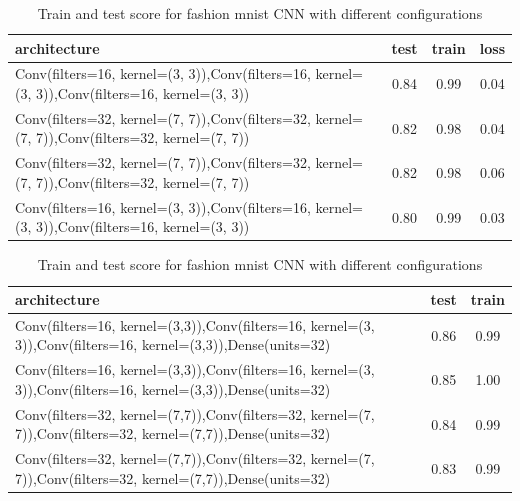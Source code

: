 \documentclass[10pt]{SelfArx} %
\begin{document}
	\begin{table}[]
		\begin{tabular*}{1\linewidth}{@{\extracolsep{\fill} }lccc@{}}
			\toprule
			architecture & test & train & loss \\ \midrule
			Conv(filters=16, kernel=(3, 3)),Conv(filters=16, kernel=(3, 3)),Conv(filters=16, kernel=(3, 3)) & 0.84 & 0.99 & 0.04 \\
			Conv(filters=32, kernel=(7, 7)),Conv(filters=32, kernel=(7, 7)),Conv(filters=32, kernel=(7, 7)) & 0.82 & 0.98 & 0.04 \\
			Conv(filters=32, kernel=(7, 7)),Conv(filters=32, kernel=(7, 7)),Conv(filters=32, kernel=(7, 7)) & 0.82 & 0.98 & 0.06 \\
			Conv(filters=16, kernel=(3, 3)),Conv(filters=16, kernel=(3, 3)),Conv(filters=16, kernel=(3, 3)) & 0.80 & 0.99 & 0.03 \\ \bottomrule
		\end{tabular*}
		\caption{Train and test score for fashion mnist CNN  with different configurations}
		\label{tfashion3}
	\end{table}
	\begin{table}[]
		\begin{tabular*}{1\linewidth}{@{\extracolsep{\fill} }lcc@{}}
			\toprule
			architecture & test & train \\ \midrule
			Conv(filters=16, kernel=(3,3)),Conv(filters=16, kernel=(3, 3)),Conv(filters=16, kernel=(3,3)),Dense(units=32) & 0.86 & 0.99  \\
			Conv(filters=16, kernel=(3,3)),Conv(filters=16, kernel=(3, 3)),Conv(filters=16, kernel=(3,3)),Dense(units=32) & 0.85 & 1.00  \\
			Conv(filters=32, kernel=(7,7)),Conv(filters=32, kernel=(7, 7)),Conv(filters=32, kernel=(7,7)),Dense(units=32) & 0.84 & 0.99 \\
			Conv(filters=32, kernel=(7,7)),Conv(filters=32, kernel=(7, 7)),Conv(filters=32, kernel=(7,7)),Dense(units=32) & 0.83 & 0.99 \\ \bottomrule
		\end{tabular*}
		\caption{Train and test score for fashion mnist CNN  with different configurations}
		\label{tfashion4}
	\end{table}
\end{document}
